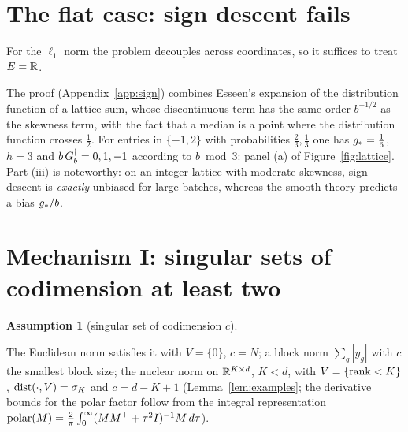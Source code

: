 \documentclass[anon,12pt]{colt2026}
\newtheorem{assumption}{Assumption}
\begin{document}
\section{The flat case: sign descent fails}\label{sec:sign}

For the $\ell_1$ norm the problem decouples across coordinates, so it suffices to treat $E=\mathbb{R}$.

\begin{theorem}\label{thm:sign}\StmtSign\end{theorem}

The proof (Appendix~\ref{app:sign}) combines Esseen's expansion of the distribution function of a lattice sum, whose
discontinuous term has the same order $b^{-1/2}$ as the skewness term, with the fact that a median is a point where
the distribution function crosses $\frac12$. For entries in $\{-1,2\}$ with probabilities $\frac23,\frac13$ one has
$g_\ast=\frac16$, $h=3$ and $b\,G_b^\dagger=0,1,-1$ according to $b\bmod3$: panel (a) of Figure~\ref{fig:lattice}. Part (iii)
is noteworthy: on an integer lattice with moderate skewness, sign descent is \emph{exactly} unbiased for large batches,
whereas the smooth theory predicts a bias $g_\ast/b$.

\section{Mechanism I: singular sets of codimension at least two}\label{sec:codim}

\begin{assumption}[singular set of codimension $c$]\label{ass:R}\StmtAssR\end{assumption}

The Euclidean norm satisfies it with $V=\{0\}$, $c=N$; a block norm $\sum_g|y_g|$ with $c$ the smallest block size; the
nuclear norm on $\mathbb{R}^{K\times d}$, $K<d$, with $V=\{\operatorname{rank}<K\}$, $\operatorname{dist}(\cdot,V)=\sigma_K$ and $c=d-K+1$
(Lemma~\ref{lem:examples}; the derivative bounds for the polar factor follow from the integral representation
$\operatorname{polar}(M)=\frac2\pi\int_0^\infty(MM^\top+\tau^2I)^{-1}M\,d\tau$).

\begin{theorem}\label{thm:codim}\StmtCodim\end{theorem}
\end{document}
